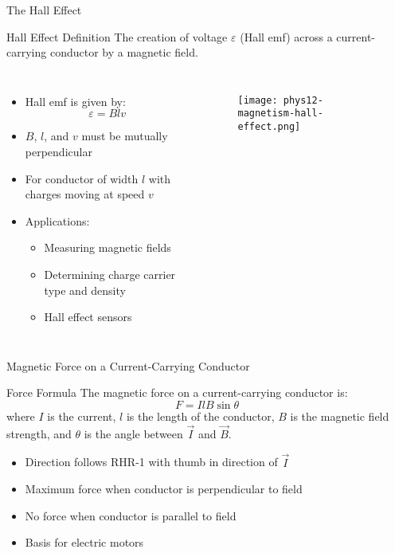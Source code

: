 \documentclass{beamer}
\begin{document}
\begin{frame}{The Hall Effect}
\begin{block}{Hall Effect Definition}
The creation of voltage $\varepsilon$ (Hall emf) across a current-carrying conductor by a magnetic field.
\end{block}

\begin{columns}
\begin{itemize}
\item Hall emf is given by:
\begin{equation}
\varepsilon = Blv
\end{equation}
\item $B$, $l$, and $v$ must be mutually perpendicular
\item For conductor of width $l$ with charges moving at speed $v$
\item Applications:
  \begin{itemize}
  \item Measuring magnetic fields
  \item Determining charge carrier type and density
  \item Hall effect sensors
  \end{itemize}
\end{itemize}

\begin{figure}
    \centering
    \texttt{[image: phys12-magnetism-hall-effect.png]}
\end{figure}
\end{columns}
\end{frame}

\begin{frame}{Magnetic Force on a Current-Carrying Conductor}
\begin{block}{Force Formula}
The magnetic force on a current-carrying conductor is:
\begin{equation}
F = IlB\sin\theta
\end{equation}
where $I$ is the current, $l$ is the length of the conductor, $B$ is the magnetic field strength, and $\theta$ is the angle between $\vec{I}$ and $\vec{B}$.
\end{block}


\begin{itemize}
\item Direction follows RHR-1 with thumb in direction of $\vec{I}$
\item Maximum force when conductor is perpendicular to field
\item No force when conductor is parallel to field
\item Basis for electric motors
\end{itemize}


\end{frame}
\end{document}

